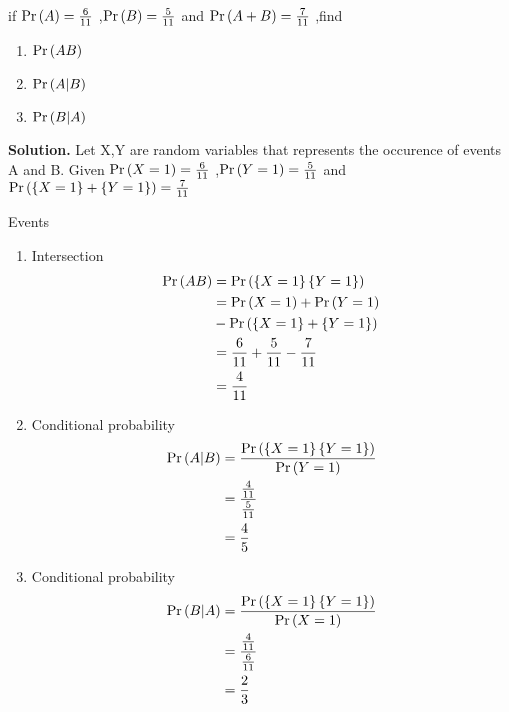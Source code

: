 \documentclass[journal,12pt,twocolumn]{IEEEtran}
\begin{document}
   if $\Pr\left(A\right)=\frac{6}{11}$ ,$\Pr\left(B\right)=\frac{5}{11}$  and $\Pr\left(A+ B\right)=\frac{7}{11}$ ,find
   \begin{enumerate}
   	\item $\Pr\left(AB\right)$
   	\item$\Pr\left(A|B\right)$
   	\item$\Pr\left(B|A\right)$
   \end{enumerate}
\textbf{Solution.}
	Let X,Y are random variables that represents the occurence of events A and B.
Given $\Pr\left(X=1\right)=\frac{6}{11}$ ,$\Pr\left(Y=1\right)=\frac{5}{11}$ and $\Pr\left(\left\{X=1\right\} +\left\{Y=1\right\}\right)=\frac{7}{11}$
	\begin{table}[ht!]
		\centering
		
		\caption{Events}
		\label{table:1}
	\end{table}
\begin{enumerate}
\item Intersection 
\begin{align}
	\Pr\left(AB\right)&=\Pr\left(\left\{X=1\right\}\left\{Y=1\right\}\right)
	\\
     &=\Pr\left(X=1\right)+\Pr\left(Y=1\right)
     \\
     & -\Pr\left(\left\{X=1\right\}+\left\{Y=1\right\}\right)    
     \\
     &=\frac{6}{11}+\frac{5}{11}-\frac{7}{11}
     \\
     &=\frac{4}{11}     
\end{align}
	\item Conditional probability
	\begin{align}
		\Pr\left(A|B\right)&=\frac{\Pr\left(\left\{X=1\right\}\left\{Y=1\right\}\right)}{\Pr\left(Y=1\right)}\\
		        &=\frac{\frac{4}{11}}{\frac{5}{11}}\\
		        &=\frac{4}{5}
	\end{align}
\item Conditional probability
	\begin{align}
	\Pr\left(B|A\right)&=\frac{\Pr\left(\left\{X=1\right\}\left\{Y=1\right\}\right)}{\Pr\left(X=1\right)}\\
	&=\frac{\frac{4}{11}}{\frac{6}{11}}\\
	 &=\frac{2}{3}
   \end{align}
	\end{enumerate}

    
\end{document}
